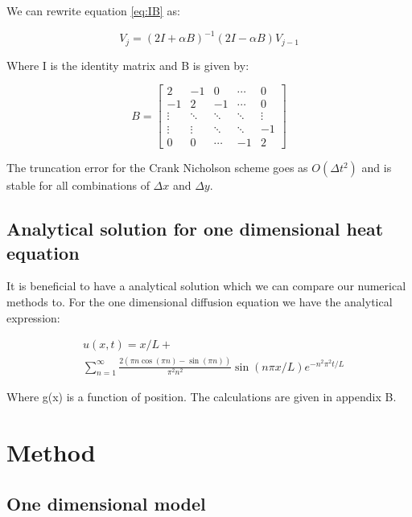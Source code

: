 \documentclass{article}
\begin{document}
\begin{multicols}{2}
We can rewrite equation \ref{eq:IB} as:

\begin{equation}
V_j = (2I+\alpha B)^{-1}(2I-\alpha B)V_{j-1}
\end{equation}

Where I is the identity matrix and B is given by:

\begin{equation*}
B = 
\begin{bmatrix}
2 & -1 & 0 & \cdots & 0 \\
-1 & 2 & -1 & \cdots & 0  \\
\vdots  & \ddots  & \ddots & \ddots & \vdots  \\
\vdots  & \vdots  & \ddots & \ddots & -1  \\
0 & 0 & \cdots & -1 & 2
\end{bmatrix}
\end{equation*}

The truncation error for the Crank Nicholson scheme goes as $O(\Delta t^2)$ and is stable for all combinations of $\Delta x$ and $\Delta y$. 

\subsection{Analytical solution for one dimensional heat equation}

It is beneficial to have a analytical solution which we can compare our numerical methods to. For the one dimensional diffusion equation we have the analytical expression:

\begin{equation}
\begin{split}
&u(x,t)=x/L+\\
&\sum_{n=1}^{\infty}\frac{2(\pi n \cos{(\pi n)}-\sin{(\pi n)})}{\pi^2n^2}\sin{(n\pi x/L)}e^{-n^2\pi^2t/L}
\end{split}
\label{eq:ana_sol}
\end{equation}

Where g(x) is a function of position. The calculations are given in appendix B. 

\section{Method}


\subsection{One dimensional model}


\end{multicols}
\end{document}
